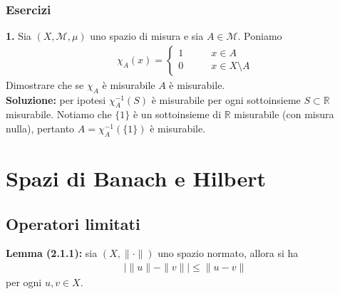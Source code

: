 \documentclass{article}
\numberwithin{equation}{subsection}
\begin{document}
\subsubsection{Esercizi}
\textbf{1.} Sia $(X, \mathcal{M}, \mu)$ uno spazio di misura e sia $A \in \mathcal{M}$. Poniamo 
\begin{align*}
    \chi_A(x) = \begin{cases}
        1 \qquad &x \in A \\
        0 \qquad &x \in X \setminus A
    \end{cases} 
\end{align*}
Dimostrare che se $\chi_A$ è misurabile $A$ è misurabile. \\

\textbf{Soluzione:} per ipotesi $\chi^{-1}_A(S)$ è misurabile per ogni sottoinsieme $S \subset \mathbb{R}$ misurabile. Notiamo che $\{1\}$ è un sottoinsieme di $\mathbb{R}$ misurabile (con misura nulla), pertanto $A = \chi^{-1}_A(\{1\})$ è misurabile.

\newpage
\section{Spazi di Banach e Hilbert}
\subsection{Operatori limitati}
\textbf{Lemma (2.1.1):} sia $(X, \|\cdot\|)$ uno spazio normato, allora si ha
\begin{gather*}
    |\|u\| - \|v\|| \leq \|u - v\| 
\end{gather*}
per ogni $u, v \in X$. \\
\end{document}
